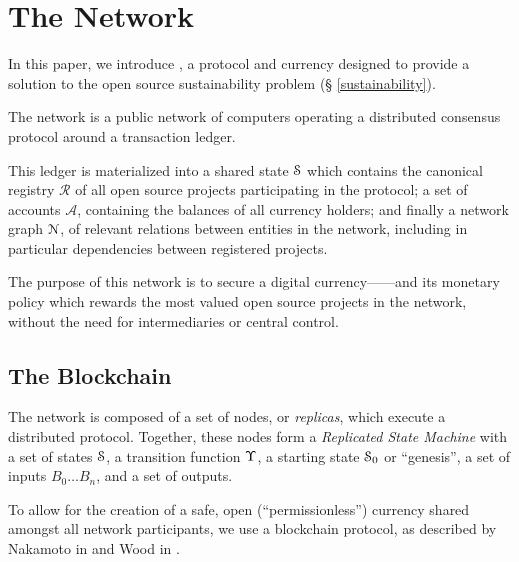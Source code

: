 \section{The \oscoin{} Network}



\noindent In this paper, we introduce \oscoin{}, a protocol and currency
designed to provide a solution to the open source sustainability problem (\S
\ref{sustainability}).

The \oscoin{} network is a public network of computers operating a distributed
consensus protocol around a transaction ledger.

This ledger is materialized into a shared state $\mathcal{S}$ which
contains the canonical registry $\mathcal{R}$ of all open source
projects participating in the \oscoin{} protocol; a set of accounts
$\mathcal{A}$, containing the balances of all currency holders; and
finally a network graph $\mathcal{N}$, of relevant relations between
entities in the network, including in particular dependencies between
registered projects.

The purpose of this network is to secure a digital
currency---\oscoin{}---and its monetary policy which rewards the most
valued open source projects in the network, without the need for
intermediaries or central control.

\subsection{The \oscoin{} Blockchain}

The \oscoin{} network is composed of a set of nodes, or \emph{replicas}, which
execute a distributed protocol. Together, these nodes form a \emph{Replicated
State Machine} with a set of states $\mathcal{S}$, a transition function $\Upsilon$,
a starting state $\mathcal{S}_0$ or ``genesis'', a set of inputs $B_0 \dotso B_n$,
and a set of outputs.

To allow for the creation of a safe, open (``permissionless'') currency shared
amongst all network participants, we use a blockchain protocol, as described by
Nakamoto in \cite{bitcoin} and Wood in \cite{ethereum}.

